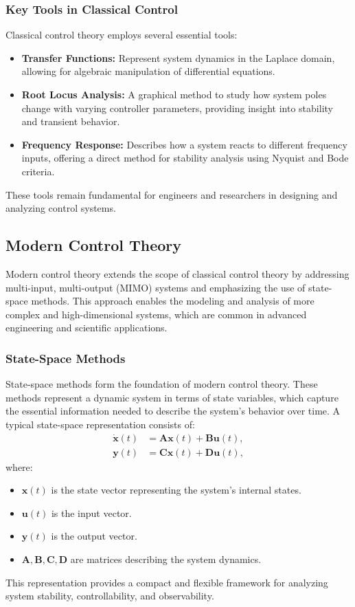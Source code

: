 \documentclass{IEEEojcsys}
\begin{document}
\subsubsection{Key Tools in Classical Control}
Classical control theory employs several essential tools:
\begin{itemize}
    \item \textbf{Transfer Functions:} Represent system dynamics in the Laplace domain, allowing for algebraic manipulation of differential equations.
    \item \textbf{Root Locus Analysis:} A graphical method to study how system poles change with varying controller parameters, providing insight into stability and transient behavior.
    \item \textbf{Frequency Response:} Describes how a system reacts to different frequency inputs, offering a direct method for stability analysis using Nyquist and Bode criteria.
\end{itemize}
These tools remain fundamental for engineers and researchers in designing and analyzing control systems.

\subsection{Modern Control Theory}
Modern control theory extends the scope of classical control theory by addressing multi-input, multi-output (MIMO) systems and emphasizing the use of state-space methods. This approach enables the modeling and analysis of more complex and high-dimensional systems, which are common in advanced engineering and scientific applications.

\subsubsection{State-Space Methods}
State-space methods form the foundation of modern control theory. These methods represent a dynamic system in terms of state variables, which capture the essential information needed to describe the system's behavior over time. A typical state-space representation consists of:
\begin{align}
    \dot{\mathbf{x}}(t) &= \mathbf{A}\mathbf{x}(t) + \mathbf{B}\mathbf{u}(t), \\
    \mathbf{y}(t) &= \mathbf{C}\mathbf{x}(t) + \mathbf{D}\mathbf{u}(t),
\end{align}
where:
\begin{itemize}
    \item $\mathbf{x}(t)$ is the state vector representing the system's internal states.
    \item $\mathbf{u}(t)$ is the input vector.
    \item $\mathbf{y}(t)$ is the output vector.
    \item $\mathbf{A}, \mathbf{B}, \mathbf{C}, \mathbf{D}$ are matrices describing the system dynamics.
\end{itemize}
This representation provides a compact and flexible framework for analyzing system stability, controllability, and observability.
\end{document}
